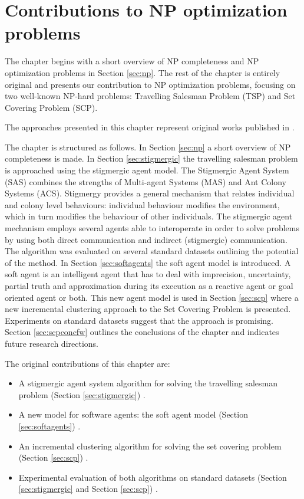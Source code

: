 \chapter{Contributions to NP optimization problems}
\label{chap:softagents}

The chapter begins with a short overview of NP completeness and NP optimization problems in Section \ref{sec:np}. The rest of the chapter is entirely original and presents our contribution to NP optimization problems, focusing on two  well-known NP-hard problems: Travelling Salesman Problem (TSP) and Set Covering Problem (SCP).

The approaches presented in this chapter represent original works published in \cite{Chira07Stigmergic, Gaceanu12SCP}.

The chapter is structured as follows. In Section \ref{sec:np} a short overview of NP completeness is made. In Section \ref{sec:stigmergic} the travelling salesman problem is approached using the stigmergic agent model. The Stigmergic Agent System (SAS) combines the strengths of Multi-agent Systems (MAS) and Ant Colony Systems (ACS).  Stigmergy provides a general mechanism that relates individual and colony level behaviours: individual behaviour modifies the environment, which in turn modifies the behaviour of other individuals. The stigmergic agent mechanism employs several agents able to interoperate in order to solve problems by using both direct communication and indirect (stigmergic) communication. The algorithm was evaluated on several standard datasets outlining the potential of the method. 
In Section \ref{sec:softagents} the soft agent model is introduced. A soft agent is an intelligent agent that has to deal with imprecision, uncertainty, partial truth and approximation during its execution as a reactive agent or goal oriented agent or both. This new agent model is used in Section \ref{sec:scp} where a new incremental clustering approach to the Set Covering Problem is presented. Experiments on standard datasets suggest that the approach is promising. Section \ref{sec:scpconcfw} outlines the conclusions of the chapter and indicates future research directions.

The original contributions of this chapter are:

\begin{itemize}
\item A stigmergic agent system algorithm for solving the travelling salesman problem (Section \ref{sec:stigmergic}) \cite{Chira07Stigmergic}.
\item A new model for software agents: the soft agent model (Section \ref{sec:softagents}) \cite{Gaceanu12SCP}.
\item An incremental clustering algorithm for solving the set covering problem (Section \ref{sec:scp}) \cite{Gaceanu12SCP}.
\item Experimental evaluation of both algorithms on standard datasets (Section \ref{sec:stigmergic} and Section \ref{sec:scp}) \cite{Chira07Stigmergic, Gaceanu12SCP}.
\end{itemize}





